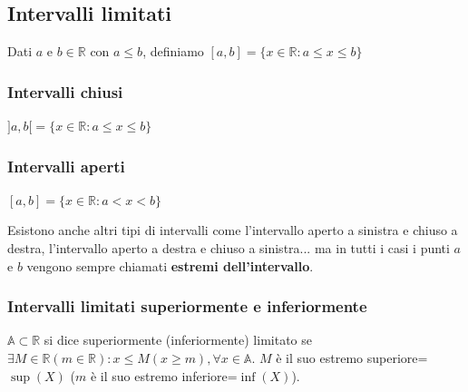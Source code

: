 \subsection*{Intervalli limitati}
\begin{definition}
    Dati $a$ e $b \in \mathbb{R}$ con $a \leq b$, definiamo $[a,b]=\{x\in\mathbb{R}:a\leq x\leq b\}$
\end{definition}

\subsubsection*{Intervalli chiusi}
$]a,b[=\{x\in\mathbb{R}:a\leq x\leq b\}$

\subsubsection*{Intervalli aperti}
$[a,b]=\{x\in\mathbb{R}:a<x<b\}$

Esistono anche altri tipi di intervalli come l'intervallo aperto a sinistra e chiuso a destra, l'intervallo aperto a destra e chiuso a sinistra... ma in tutti i casi i punti $a$ e $b$ vengono sempre chiamati \textbf{estremi dell'intervallo}.

\subsubsection*{Intervalli limitati superiormente e inferiormente}
\begin{definition}
    $\mathbb{A}\subset\mathbb{R}$ si dice superiormente (inferiormente) limitato se $\exists M\in\mathbb{R}(m\in\mathbb{R}):x\leq M(x\geq m), \forall x\in\mathbb{A}$. $M$ è il suo estremo superiore=$\sup(X)$ ($m$ è il suo estremo inferiore=$\inf(X)$).
\end{definition}

